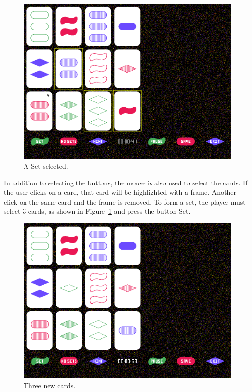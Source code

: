 \documentclass[11pt,a4paper,reqno]{report}
\numberwithin{equation}{section}
\begin{document}
\begin{figure}[htbp]
\begin{center}
\includegraphics[scale=0.3]{game_select.png}
\caption{A Set selected.}
\label{game_select}
\end{center}
\end{figure}

In addition to selecting the buttons, the mouse is also used to select the cards. If the user clicks on a card, that card will be highlighted with a frame. Another click on the same card and the frame is removed. To form a set, the player must select 3 cards, as shown in Figure~\ref{game_select} and press the button Set.

\begin{figure}[htbp]
\begin{center}
\includegraphics[scale=0.3]{game_add.png}
\caption{Three new cards.}
\label{game_add}
\end{center}
\end{figure}
\end{document}
